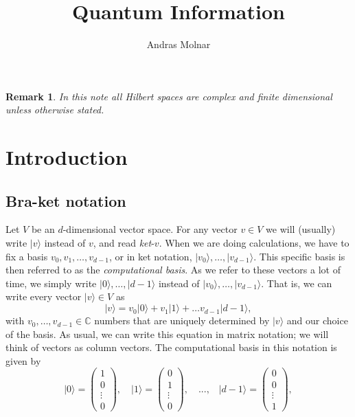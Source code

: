 \documentclass{article}
\title{Quantum Information}
\author{Andras Molnar}
\newtheorem{remark}{Remark}
\theoremstyle{definition}
\newcommand{\ket}[1]{\vert #1 \rangle}
\begin{document}
\maketitle

\begin{remark}
  In this note all Hilbert spaces are complex and finite dimensional unless otherwise stated.
\end{remark}


\section{Introduction}

\subsection{Bra-ket notation}
Let $V$ be an $d$-dimensional vector space. For any vector $v\in V$ we will (usually) write $\ket{v}$ instead of $v$, and read \emph{ket}-$v$. When we are doing calculations, we have to fix a basis $v_0, v_1 , \dots, v_{d-1}$, or in ket notation, $\ket{v_0}, \dots , \ket{v_{d-1}}$. This specific basis is then referred to as the \emph{computational basis}.  As we refer to these vectors a lot of time, we simply write $\ket{0}, \dots, \ket{d-1}$ instead of $\ket{v_0}, \dots , \ket{v_{d-1}}$.  That is, we can write every vector $\ket{v}\in V$ as
\begin{equation}\label{eq:vector_decomp}
  \ket{v} = v_0 \ket{0} + v_1 \ket{1} +\dots v_{d-1} \ket{d-1},
\end{equation} 
with $v_0, \dots, v_{d-1}\in \mathbb{C}$ numbers that are uniquely determined by $\ket{v}$ and our choice of the basis. As usual, we can write this equation in matrix notation; we will think of vectors as column vectors. The computational basis in this notation is given by
\begin{equation*}
  \ket{0} = \begin{pmatrix} 1 \\ 0 \\ \vdots \\ 0 \end{pmatrix}, \quad 
  \ket{1} = \begin{pmatrix} 0 \\ 1 \\ \vdots \\ 0 \end{pmatrix}, \quad \text{...,} \quad
  \ket{d-1} = \begin{pmatrix} 0 \\ 0 \\ \vdots \\ 1 \end{pmatrix},
\end{equation*}
\end{document}
